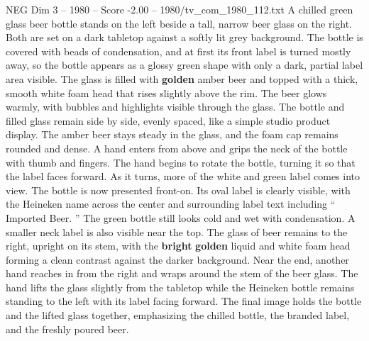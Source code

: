 \begin{textsample}{NEG Dim 3 – 1980 – Score -2.00 – 1980/tv\_com\_1980\_112.txt}  \label{ex:f3_neg_056}
A chilled green glass beer bottle stands on the left beside a tall, narrow beer glass on the right.
Both are set on a dark tabletop against a softly lit grey background.
The bottle is covered with beads of condensation, and at first its front label is turned mostly away, so the bottle appears as a glossy green shape with only a dark, partial label area visible.
The glass is filled with \textbf{golden} amber beer and topped with a thick, smooth white foam head that rises slightly above the rim.
The beer glows warmly, with bubbles and highlights visible through the glass.
The bottle and filled glass remain side by side, evenly spaced, like a simple studio product display.
The amber beer stays steady in the glass, and the foam cap remains rounded and dense.
A hand enters from above and grips the neck of the bottle with thumb and fingers.
The hand begins to rotate the bottle, turning it so that the label faces forward.
As it turns, more of the white and green label comes into view.
The bottle is now presented front-on.
Its oval label is clearly visible, with the Heineken name across the center and surrounding label text including “ Imported Beer. ” The green bottle still looks cold and wet with condensation.
A smaller neck label is also visible near the top.
The glass of beer remains to the right, upright on its stem, with the \textbf{bright} \textbf{golden} liquid and white foam head forming a clean contrast against the darker background.
Near the end, another hand reaches in from the right and wraps around the stem of the beer glass.
The hand lifts the glass slightly from the tabletop while the Heineken bottle remains standing to the left with its label facing forward.
The final image holds the bottle and the lifted glass together, emphasizing the chilled bottle, the branded label, and the freshly poured beer.

\end{textsample}

